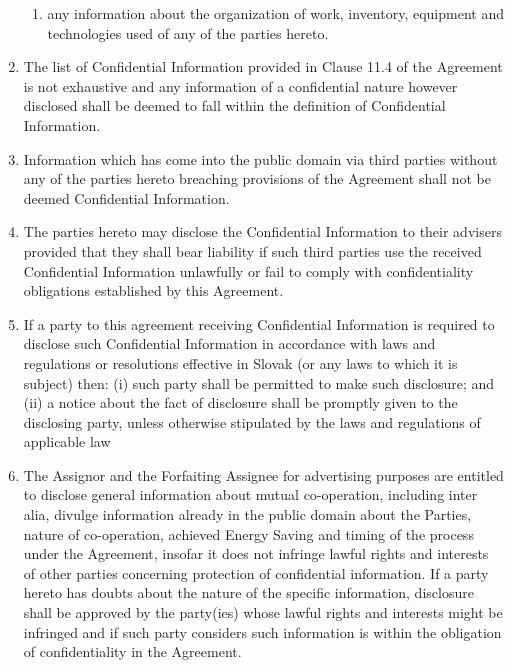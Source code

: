 \documentclass[a4paper]{article}
\begin{document}
\begin{multicols}{2}
\begin{enumerate}
\begin{enumerate}
    \item{any information about the organization of work, inventory,
        equipment and technologies used of any of the parties hereto.}
    \end{enumerate}

  \item{The list of Confidential Information provided in Clause 11.4
      of the Agreement is not exhaustive and any information of a
      confidential nature however disclosed shall be deemed to fall
      within the definition of Confidential Information.}

  \item{Information which has come into the public domain via third
      parties without any of the parties hereto breaching provisions
      of the Agreement shall not be deemed Confidential Information.}

  \item{The parties hereto may disclose the Confidential Information
      to their advisers provided that they shall bear liability if
      such third parties use the received Confidential Information
      unlawfully or fail to comply with confidentiality obligations
      established by this Agreement.}

  \item{If a party to this agreement receiving Confidential
      Information is required to disclose such Confidential
      Information in accordance with laws and regulations or
      resolutions effective in Slovak (or any laws to which it is
      subject) then: (i) such party shall be permitted to make such
      disclosure; and (ii) a notice about the fact of disclosure shall
      be promptly given to the disclosing party, unless otherwise
      stipulated by the laws and regulations of applicable law}

  \item{The Assignor and the Forfaiting Assignee for advertising
      purposes are entitled to disclose general information about
      mutual co{-}operation, including inter alia, divulge information
      already in the public domain about the Parties, nature of
      co{-}operation, achieved Energy Saving and timing of the process
      under the Agreement, insofar it does not infringe lawful rights
      and interests of other parties concerning protection of
      confidential information. If a party hereto has doubts about the
      nature of the specific information, disclosure shall be approved
      by the party(ies) whose lawful rights and interests might be
      infringed and if such party considers such information is within
      the obligation of confidentiality in the Agreement.}


\end{enumerate}
\end{multicols}
\end{document}
